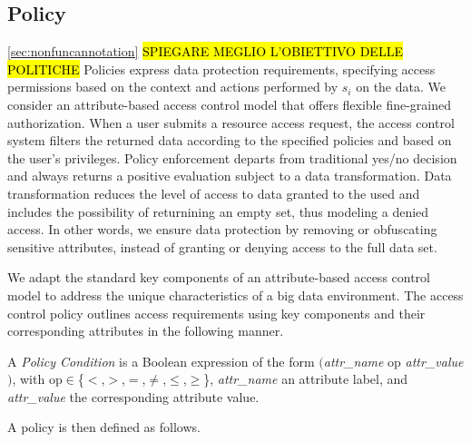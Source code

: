 \subsection{Policy}\ref{sec:nonfuncannotation}
\hl{SPIEGARE MEGLIO L'OBIETTIVO DELLE POLITICHE}
Policies express data protection requirements, specifying access permissions based on the context and actions performed by $s_i$ on the data. We consider an attribute-based access control model that offers flexible fine-grained authorization. %
When a user submits a resource access request, the access control system filters the returned data according to the specified policies and based on the user's privileges. Policy enforcement departs from traditional yes/no decision and always returns a positive evaluation subject to a data transformation. Data transformation reduces the level of access to data granted to the used and includes the possibility of returnining an empty set, thus modeling a denied access.
In other words, we ensure data protection by removing or obfuscating sensitive attributes, instead of granting or denying access to the full data set.

We adapt the standard key components of an attribute-based access control model to address the unique characteristics of a big data environment.
The access control policy outlines access requirements using key components and their corresponding attributes in the following manner.

\begin{definition}\label{def:policy_cond}
  A \emph{Policy Condition} is a Boolean expression of the form $($\emph{attr\_name} op \emph{attr\_value}$)$, with op$\in$\{$<$,$>$,$=$,$\neq$,$\leq$,$\geq$\}, \emph{attr\_name} an attribute label, and \emph{attr\_value} the corresponding attribute value.
\end{definition}

A policy is then defined as follows.

